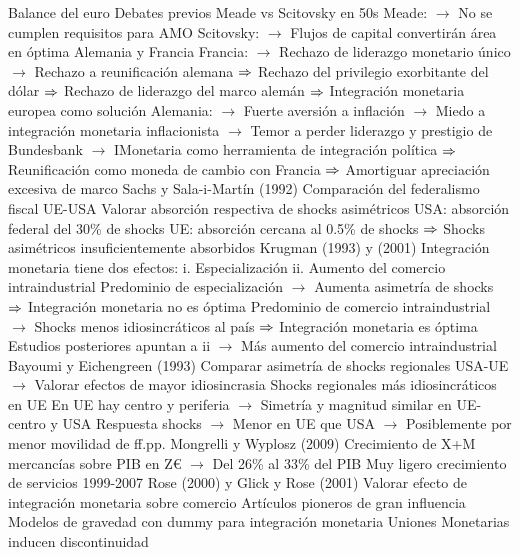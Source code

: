 \documentclass{nuevotema}
\begin{document}
\begin{esquemal}
		\2 Balance del euro
			\3 Debates previos
				\4 Meade vs Scitovsky en 50s
				\4[] Meade:
				\4[] $\to$ No se cumplen requisitos para AMO
				\4[] Scitovsky:
				\4[] $\to$ Flujos de capital convertirán área en óptima
				\4 Alemania y Francia
				\4[] Francia:
				\4[] $\to$ Rechazo de liderazgo monetario único
				\4[] $\to$ Rechazo a reunificación alemana
				\4[] $\Rightarrow$ Rechazo del privilegio exorbitante del dólar
				\4[] $\Rightarrow$ Rechazo de liderazgo del marco alemán
				\4[] $\Rightarrow$ Integración monetaria europea como solución
				\4[] Alemania:
				\4[] $\to$ Fuerte aversión a inflación
				\4[] $\to$ Miedo a integración monetaria inflacionista
				\4[] $\to$ Temor a perder liderazgo y prestigio de Bundesbank
				\4[] $\to$ IMonetaria como herramienta de integración política
				\4[] $\Rightarrow$ Reunificación como moneda de cambio con Francia
				\4[] $\Rightarrow$ Amortiguar apreciación excesiva de marco
				\4 Sachs y Sala-i-Martín (1992)
				\4[] Comparación del federalismo fiscal UE-USA
				\4[] Valorar absorción respectiva de shocks asimétricos
				\4[] USA: absorción federal del 30\% de shocks
				\4[] UE: absorción cercana al 0.5\% de shocks
				\4[] $\Rightarrow$ Shocks asimétricos insuficientemente absorbidos
				\4 Krugman (1993) y (2001)
				\4[] Integración monetaria tiene dos efectos:
				\4[] i. Especialización
				\4[] ii. Aumento del comercio intraindustrial
				\4[] Predominio de especialización
				\4[] $\to$ Aumenta asimetría de shocks
				\4[] $\Rightarrow$ Integración monetaria no es óptima
				\4[] Predominio de comercio intraindustrial
				\4[] $\to$ Shocks menos idiosincráticos al país
				\4[] $\Rightarrow$ Integración monetaria es óptima
				\4[] Estudios posteriores apuntan a ii
				\4[] $\to$ Más aumento del comercio intraindustrial
				\4 Bayoumi y Eichengreen (1993)
				\4[] Comparar asimetría de shocks regionales USA-UE
				\4[] $\to$ Valorar efectos de mayor idiosincrasia
				\4[] Shocks regionales más idiosincráticos en UE
				\4[] En UE hay centro y periferia
				\4[] $\to$ Simetría y magnitud similar en UE-centro y USA
				\4[] Respuesta shocks
				\4[] $\to$ Menor en UE que USA
				\4[] $\to$ Posiblemente por menor movilidad de ff.pp.
				\4 Mongrelli y Wyplosz (2009)
				\4[] Crecimiento de X+M mercancías sobre PIB en Z€
				\4[] $\to$ Del 26\% al 33\% del PIB
				\4[] Muy ligero crecimiento de servicios 1999-2007
				\4 Rose (2000) y Glick y Rose (2001)
				\4[] Valorar efecto de integración monetaria sobre comercio
				\4[] Artículos pioneros de gran influencia
				\4[] Modelos de gravedad con dummy para integración monetaria
				\4[] Uniones Monetarias inducen discontinuidad

\end{esquemal}
\end{document}
